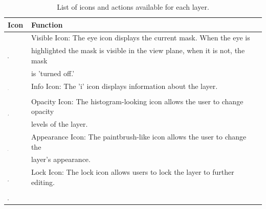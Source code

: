 \documentclass[fleqn,11pt,openany]{book}
\begin{document}
\begin{table}[h!]
\label{tab:layericons}
\caption{List of icons and actions available for each layer.}
\begin{tabular}{|l|l|}
\hline
{\bf Icon} & {\bf Function}\\
\hline
\multirow{3}{*}{ \includegraphics[width=0.05\textwidth]{Seg3DBasicFunctionality_figures/VisibleOff.png} }
& Visible Icon: The eye icon displays the current mask.  When the eye is \\
& highlighted the mask is visible in the view plane, when it is not, the mask \\
& is 'turned off.'\\
\hline
\multirow{2}{*}{ \includegraphics[width=0.05\textwidth]{Seg3DBasicFunctionality_figures/infoOff.png} }
& Info Icon: The 'i' icon displays information about the layer.\\
& \\
\hline
\multirow{2}{*}{ \includegraphics[width=0.05\textwidth]{Seg3DBasicFunctionality_figures/OpacityOff.png} }
& Opacity Icon: The histogram-looking icon allows the user to change opacity\\
& levels of the layer.\\
\hline
\multirow{2}{*}{ \includegraphics[width=0.04\textwidth]{Seg3DBasicFunctionality_figures/AppearanceOff.png} }
& Appearance Icon: The paintbrush-like icon allows the user to change the \\
& layer's appearance.\\
\hline
\multirow{2}{*}{ \includegraphics[width=0.05\textwidth]{Seg3DBasicFunctionality_figures/LockOff.png} }
& Lock Icon: The lock icon allows users to lock the layer to further editing.\\
& \\
\hline
\multirow{2}{*}{ \includegraphics[width=0.05\textwidth]{Seg3DBasicFunctionality_figures/IsosurfaceVisibleOff.png} }

\end{tabular}
\end{table}
\end{document}
